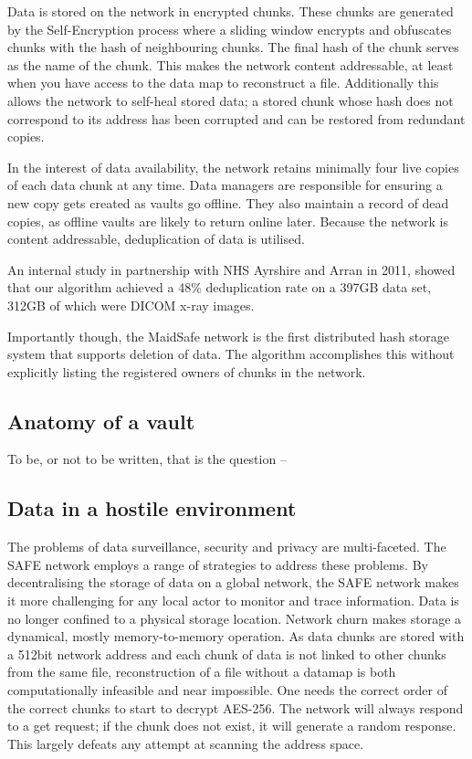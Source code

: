 \documentclass[twocolumn,english]{article}
\begin{document}
Data is stored on the network in encrypted chunks. These chunks are generated by the Self-Encryption process where a sliding window encrypts and obfuscates chunks with the hash of neighbouring chunks. The final hash of the chunk serves as the name of the chunk.  This makes the network content addressable, at least when you have access to the data map to reconstruct a file\cite{msEncrypt}. Additionally this allows the network to self-heal stored data; a stored chunk whose hash does not correspond to its address has been corrupted and can be restored from redundant copies.

In the interest of data availability, the network retains minimally four live
copies of each data chunk at any time. Data managers are responsible for ensuring a new copy gets created as vaults go offline.  They also maintain a record of dead copies, as offline vaults are likely to return online later.  Because the network is content addressable, deduplication of data is utilised.

An internal study in partnership with NHS Ayrshire and Arran in 2011, showed that our algorithm achieved a 48\% deduplication rate on a 397GB data set, 312GB of which were DICOM x-ray images.

Importantly though, the MaidSafe network is the first distributed hash storage system that supports deletion of data.  The algorithm accomplishes this without explicitly listing the registered owners of chunks in the network. 


\subsection{Anatomy of a vault}\label{anatomy}

To be, or not to be written, that is the question --

\subsection{Data in a hostile environment}

The problems of data surveillance, security and privacy are multi-faceted. The SAFE network employs a range of strategies to address these problems. By decentralising the storage of data on a global network, the SAFE
network makes it more challenging for any local actor to monitor and trace information.  Data is no longer confined to a physical storage location.  Network churn makes storage a dynamical, mostly memory-to-memory operation.
As data chunks are stored with a 512bit network address and each chunk of data
is not linked to other chunks from the same file, reconstruction of a file without a datamap is both computationally infeasible and near impossible.  One needs the correct order of the correct chunks to start to decrypt AES-256.  The network will always respond to a get request; if the chunk does not exist, it will generate a random response. This largely defeats any attempt at scanning the address space.
\end{document}
